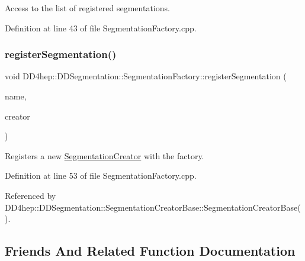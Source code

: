 Access to the list of registered segmentations. 



Definition at line 43 of file Segmentation\+Factory.\+cpp.

\hypertarget{class_d_d4hep_1_1_d_d_segmentation_1_1_segmentation_factory_afb766eaf4c362ae719d29ca764e8cdeb}{}\label{class_d_d4hep_1_1_d_d_segmentation_1_1_segmentation_factory_afb766eaf4c362ae719d29ca764e8cdeb} 
\subsubsection{\texorpdfstring{register\+Segmentation()}{registerSegmentation()}}
{\footnotesize\ttfamily void D\+D4hep\+::\+D\+D\+Segmentation\+::\+Segmentation\+Factory\+::register\+Segmentation (\begin{DoxyParamCaption}\item[{const std\+::string \&}]{name,  }\item[{\hyperlink{class_d_d4hep_1_1_d_d_segmentation_1_1_segmentation_creator_base}{Segmentation\+Creator\+Base} $\ast$}]{creator }\end{DoxyParamCaption})\hspace{0.3cm}{\ttfamily [protected]}}



Registers a new \hyperlink{class_d_d4hep_1_1_d_d_segmentation_1_1_segmentation_creator}{Segmentation\+Creator} with the factory. 



Definition at line 53 of file Segmentation\+Factory.\+cpp.



Referenced by D\+D4hep\+::\+D\+D\+Segmentation\+::\+Segmentation\+Creator\+Base\+::\+Segmentation\+Creator\+Base().



\subsection{Friends And Related Function Documentation}
\hypertarget{class_d_d4hep_1_1_d_d_segmentation_1_1_segmentation_factory_ab25c2677f6e2445716078cc5c9e87009}{}\label{class_d_d4hep_1_1_d_d_segmentation_1_1_segmentation_factory_ab25c2677f6e2445716078cc5c9e87009} 
